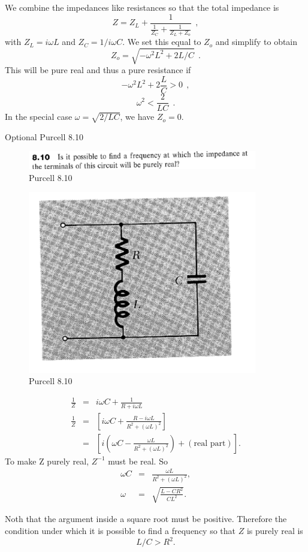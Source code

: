 \documentclass[makesolutionspdf]{esg8022pset}
\begin{document}
\begin{solution}
  We combine the impedances like resistances so that the total impedance is
  \[ Z = Z_L + \frac{1}{\frac{1}{Z_C} + \frac{1}{Z_L + Z_o}}\ \ , \]
  with $Z_L = i\omega L$ and $Z_C = 1/i\omega C$. We set this equal to $Z_o$ and simplify to obtain
  \[ Z_o = \sqrt{-\omega^2L^2 + 2L/C}\ \ .\]
  This will be pure real and thus a pure resistance if
  \[ -\omega^2L^2 + 2\frac{L}{C} >0 \ \ ,\]
  \[ \omega^2 < \frac{2}{LC}\ \ .\]
  In the special case $\omega = \sqrt{2/LC}$, we have $Z_o=0$. 
\end{solution}


\begin{problem}{Optional Purcell 8.10}
  \begin{figure}[H]
    \centering
    \includegraphics[width = 10cm]{pu810}
    \caption{Purcell 8.10}
  \end{figure}
  
  \begin{figure}[H]
    \centering
    \includegraphics[width = 10cm]{figpu810}
    \caption{Purcell 8.10}
  \end{figure}
\end{problem}

\begin{solution}
  \begin{eqnarray}
  \frac{1}{Z} &=& i\omega C + \frac{1}{R+i\omega L}\nonumber\\
  \frac{1}{Z} &=&\left[i\omega C+\frac{R-i\omega L}{R^2+(\omega
  L)^2}\right]\nonumber\\
  &=& \left[ i(\omega C-\frac{\omega L}{R^2+(\omega
  L)^2})+(\textrm{real part})\right].
  \end{eqnarray}
  To make Z purely real, $Z^{-1}$ must be real.  So
  \begin{eqnarray}
  \omega C &=& \frac{\omega L}{R^2+(\omega L)^2},\\
  \omega &=& \sqrt{\frac{L-CR^2}{CL^2}}.
  \end{eqnarray}

  Noth that the argument inside a square root must be positive.
  Therefore the condition under which it is possible to find 
  a frequency so that $Z$ is purely real is 
  \begin{equation}
  L/C>R^2.
  \end{equation}
\end{solution}
\end{document}
